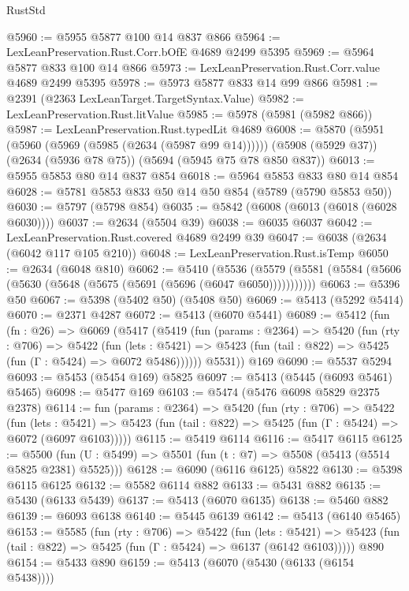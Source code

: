 \begin{lexlean}{RustStd}
\begin{coremodule}
@5960 := @5955 @5877 @100 @14 @837 @866
@5964 := LexLeanPreservation.Rust.Corr.bOfE @4689 @2499 @5395
@5969 := @5964 @5877 @833 @100 @14 @866
@5973 := LexLeanPreservation.Rust.Corr.value @4689 @2499 @5395
@5978 := @5973 @5877 @833 @14 @99 @866
@5981 := @2391 (@2363 LexLeanTarget.TargetSyntax.Value)
@5982 := LexLeanPreservation.Rust.litValue
@5985 := @5978 (@5981 (@5982 @866))
@5987 := LexLeanPreservation.Rust.typedLit @4689
@6008 := @5870
    (@5951 (@5960 (@5969 (@5985 (@2634 (@5987 @99 @14))))))
    (@5908 (@5929 @37))
    (@2634 (@5936 @78 @75))
    (@5694 (@5945 @75 @78 @850 @837))
@6013 := @5955 @5853 @80 @14 @837 @854
@6018 := @5964 @5853 @833 @80 @14 @854
@6028 := @5781 @5853 @833 @50 @14 @50 @854 (@5789 (@5790 @5853 @50))
@6030 := @5797 (@5798 @854)
@6035 := @5842 (@6008 (@6013 (@6018 (@6028 @6030))))
@6037 := @2634 (@5504 @39)
@6038 := @6035 @6037
@6042 := LexLeanPreservation.Rust.covered @4689 @2499 @39
@6047 := @6038 (@2634 (@6042 @117 @105 @210))
@6048 := LexLeanPreservation.Rust.isTemp
@6050 := @2634 (@6048 @810)
@6062 := @5410
    (@5536 (@5579 (@5581 (@5584 (@5606 (@5630 (@5648 (@5675 (@5691 (@5696 (@6047 @6050)))))))))))
@6063 := @5396 @50
@6067 := @5398 (@5402 @50) (@5408 @50)
@6069 := @5413 (@5292 @5414)
@6070 := @2371 @4287
@6072 := @5413 (@6070 @5441)
@6089 := @5412
    (fun (fn : @26) =>
    @6069
      (@5417
        (@5419
          (fun (params : @2364) =>
          @5420
            (fun (rty : @706) =>
            @5422
              (fun (lets : @5421) =>
              @5423 (fun (tail : @822) => @5425 (fun (Γ : @5424) => @6072 @5486))))))
        @5531))
    @169
@6090 := @5537 @5294
@6093 := @5453 (@5454 @169) @5825
@6097 := @5413 (@5445 (@6093 @5461) @5465)
@6098 := @5477 @169
@6103 := @5474 (@5476 @6098 @5829 @2375 @2378)
@6114 := fun (params : @2364) =>
  @5420
    (fun (rty : @706) =>
    @5422
      (fun (lets : @5421) =>
      @5423 (fun (tail : @822) => @5425 (fun (Γ : @5424) => @6072 (@6097 @6103)))))
@6115 := @5419 @6114
@6116 := @5417 @6115
@6125 := @5500 (fun (U : @5499) => @5501 (fun (t : @7) => @5508 (@5413 (@5514 @5825 @2381) @5525)))
@6128 := @6090 (@6116 @6125) @5822
@6130 := @5398 @6115 @6125
@6132 := @5582 @6114 @882
@6133 := @5431 @882
@6135 := @5430 (@6133 @5439)
@6137 := @5413 (@6070 @6135)
@6138 := @5460 @882
@6139 := @6093 @6138
@6140 := @5445 @6139
@6142 := @5413 (@6140 @5465)
@6153 := @5585
    (fun (rty : @706) =>
    @5422
      (fun (lets : @5421) =>
      @5423 (fun (tail : @822) => @5425 (fun (Γ : @5424) => @6137 (@6142 @6103)))))
    @890
@6154 := @5433 @890
@6159 := @5413 (@6070 (@5430 (@6133 (@6154 @5438))))

\end{coremodule}
\end{lexlean}
